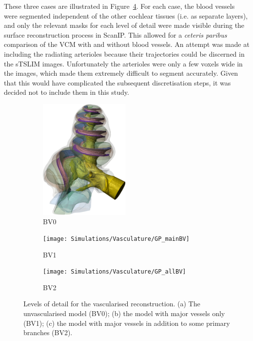 These three cases are illustrated in Figure~\ref{fig:vasc_detail}. For each
case, the blood vessels were segmented independent of the other cochlear tissues
(i.e. as separate layers), and only the relevant masks for each level of detail
were made visible during the surface reconstruction process in ScanIP. This
allowed for a \textit{ceteris paribus} comparison of the VCM with and without
blood vessels. An attempt was made at including the radiating arterioles because
their trajectories could be discerned in the sTSLIM images. Unfortunately the
arterioles were only a few voxels wide in the images, which made them extremely
difficult to segment accurately. Given that this would have complicated the
subsequent discretisation steps, it was decided not to include them in this
study.

\begin{figure}
	\centering
	
	\begin{subfigure}[t]{0.31\textwidth}
        \centering
        \includegraphics[height=6cm]{Simulations/Vasculature/GP_noBV_trans10}
        \caption{BV0}
        \label{fig:vasc_noBV}
    \end{subfigure}%
    \hfill%
    \begin{subfigure}[t]{0.31\textwidth}
        \centering
        \texttt{[image: Simulations/Vasculature/GP\_mainBV]}
        \caption{BV1}
        \label{fig:vasc_mainBV}
    \end{subfigure}%
    \hfill%
    \begin{subfigure}[t]{0.31\textwidth}
        \centering
        \texttt{[image: Simulations/Vasculature/GP\_allBV]}
        \caption{BV2}
        \label{fig:vasc_allBV}
    \end{subfigure}%
    
    \caption[Levels of detail for the vascularised reconstruction]{Levels of
    detail for the vascularised reconstruction. (a) The unvascularised model
    (BV0); (b) the model with major vessels only (BV1); (c) the model with major
    vessels in addition to some primary branches (BV2).}
	\label{fig:vasc_detail}
\end{figure}

